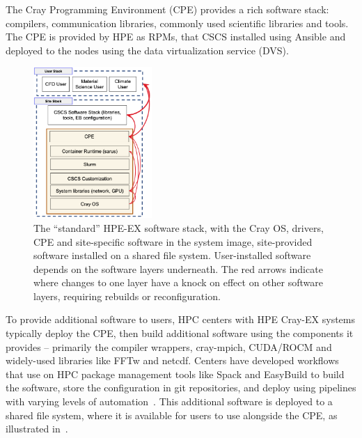 The Cray Programming Environment (CPE) provides a rich software stack: compilers, communication libraries, commonly used scientific libraries and tools.
The CPE is provided by HPE as RPMs, that CSCS installed using Ansible and deployed to the nodes using the data virtualization service (DVS)\cite{dvs}.

\begin{figure}[htp!]
    \begin{center}
        \includegraphics[width=0.4\textwidth]{./images/stack-old.png}
    \end{center}
    \caption{
        The ``standard'' HPE-EX software stack, with the Cray OS, drivers, CPE and site-specific software in the system image, site-provided software installed on a shared file system.
        User-installed software depends on the software layers underneath.
        The red arrows indicate where changes to one layer have a knock on effect on other software layers, requiring rebuilds or reconfiguration.
    }
    \label{fig:cpe-stack}
\end{figure}

To provide additional software to users, HPC centers with HPE Cray-EX systems typically deploy the CPE, then build additional software using the components it provides -- primarily the compiler wrappers, cray-mpich, CUDA/ROCM and widely-used libraries like FFTw and netcdf.
Centers have developed workflows that use on HPC package management tools like Spack and EasyBuild to build the software, store the configuration in git repositories, and deploy using pipelines with varying levels of automation~\cite{setonix2023,eb2016}.
This additional software is deployed to a shared file system, where it is available for users to use alongside the CPE, as illustrated in~.

